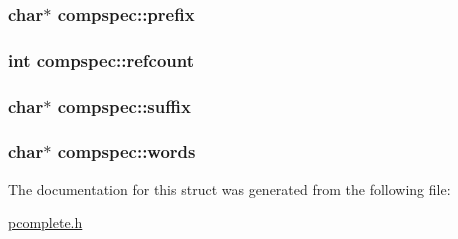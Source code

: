 \subsubsection[{\texorpdfstring{prefix}{prefix}}]{\setlength{\rightskip}{0pt plus 5cm}char$\ast$ compspec\+::prefix}\hypertarget{structcompspec_a484aa9fab29856c726e7998f1b176a33}{}\label{structcompspec_a484aa9fab29856c726e7998f1b176a33}
\subsubsection[{\texorpdfstring{refcount}{refcount}}]{\setlength{\rightskip}{0pt plus 5cm}int compspec\+::refcount}\hypertarget{structcompspec_a6b159ff5d4155e6db4cf8d00be5577b1}{}\label{structcompspec_a6b159ff5d4155e6db4cf8d00be5577b1}
\subsubsection[{\texorpdfstring{suffix}{suffix}}]{\setlength{\rightskip}{0pt plus 5cm}char$\ast$ compspec\+::suffix}\hypertarget{structcompspec_ad4c0b13772afa88fec5024829e608b53}{}\label{structcompspec_ad4c0b13772afa88fec5024829e608b53}
\subsubsection[{\texorpdfstring{words}{words}}]{\setlength{\rightskip}{0pt plus 5cm}char$\ast$ compspec\+::words}\hypertarget{structcompspec_aa45815ac115fd9e28a3794181b9a4cf6}{}\label{structcompspec_aa45815ac115fd9e28a3794181b9a4cf6}


The documentation for this struct was generated from the following file\+:\begin{DoxyCompactItemize}
\item 
\hyperlink{pcomplete_8h}{pcomplete.\+h}\end{DoxyCompactItemize}
